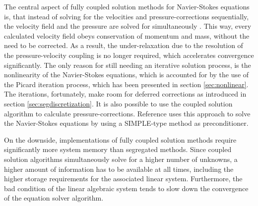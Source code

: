 The central aspect of fully coupled solution methods for Navier-Stokes equations is, that instead of solving for the velocities and pressure-corrections sequentially, the velocity field and the pressure are solved for simultaneously \cite{schaefer99}. This way, every calculated velocity field obeys conservation of momentum and mass, without the need to be corrected. As a result, the under-relaxation due to the resolution of the pressure-velocity coupling is no longer required, which accelerates convergence significantly. The only reason for still needing an iterative solution process, is the nonlinearity of the Navier-Stokes equations, which is accounted for by the use of the Picard iteration process, which has been presented in section \ref{sec:nonlinear}. The iterations, fortunately, make room for deferred corrections as introduced in section \ref{sec:segdiscretization}. It is also possible to use the coupled solution algorithm to calculate pressure-corrections. Reference \cite{klaij13} uses this approach to solve the Navier-Stokes equations by using a SIMPLE-type method as preconditioner.

On the downside, implementations of fully coupled solution methods require significantly more system memory than segregated methods. Since coupled solution algorithms simultaneously solve for a higher number of unknowns, a higher amount of information has to be available at all times, including the higher storage requirements for the associated linear system. Furthermore, the bad condition of the linear algebraic system \cite{schaefer99} tends to slow down the convergence of the equation solver algorithm.

